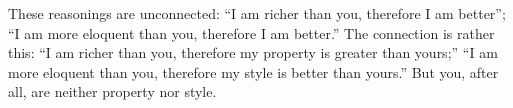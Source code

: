 These  reasonings are  unconnected:  ``I am  richer than  you,  therefore I  am
better'';  ``I  am  more  eloquent  than you,  therefore  I  am  better.''  The
connection is  rather this: ``I  am richer than  you, therefore my  property is
greater than  yours;'' ``I  am more  eloquent than you,  therefore my  style is
better than yours.'' But you, after all, are neither property nor style.
